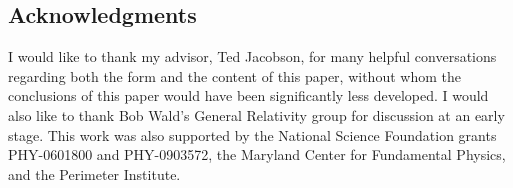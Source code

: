 \documentclass{article}
\begin{document}
\small
\subsection*{Acknowledgments}

I would like to thank my advisor, Ted Jacobson, for many helpful conversations regarding both the form and the content of this paper, without whom the conclusions of this paper would have been significantly less developed.  I would also like to thank Bob Wald's General Relativity group for discussion at an early stage.  This work was also supported by the National Science Foundation grants PHY-0601800 and PHY-0903572, the Maryland Center for Fundamental Physics, and the Perimeter Institute.
\normalsize

\begin{thebibliography}{99}


\end{thebibliography}
\end{document}
